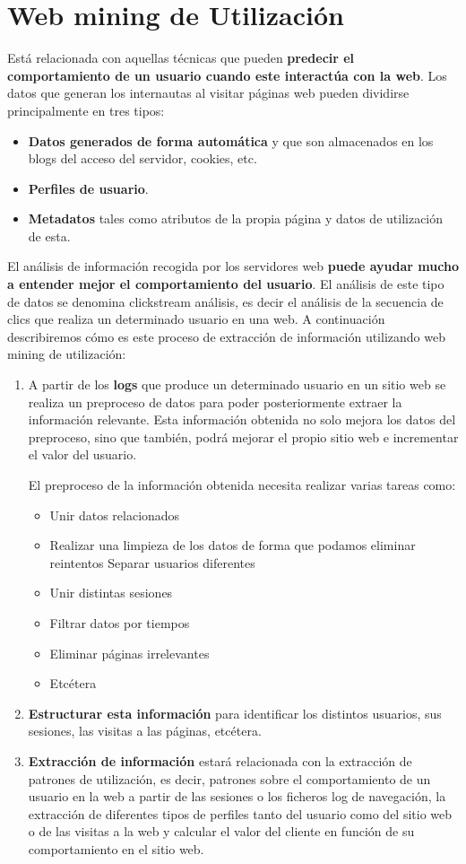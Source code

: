\documentclass[12pt, twoside, openright]{report} %
\begin{document}
\section{Web mining de Utilización}
Está relacionada con aquellas técnicas que pueden \textbf{predecir el comportamiento de un usuario cuando este interactúa con la web}. Los datos que generan los internautas al visitar páginas web pueden dividirse principalmente en tres tipos:
\begin{itemize}
	\item \textbf{Datos generados de forma automática} y que son almacenados en los blogs del acceso del servidor, cookies, etc.
	\item \textbf{Perfiles de usuario}.
	\item \textbf{Metadatos} tales como atributos de la propia página y datos de utilización de esta.
\end{itemize}
El análisis de información recogida por los servidores web \textbf{puede ayudar mucho a entender mejor el comportamiento del usuario}. El análisis de este tipo de datos se denomina clickstream análisis, es decir el análisis de la secuencia de clics que realiza un determinado usuario en una web. A continuación describiremos cómo es este proceso de extracción de información utilizando web mining de utilización:
\begin{enumerate}
	\item A partir de los \textbf{logs} que produce un determinado usuario en un sitio web se realiza un preproceso de datos para poder posteriormente extraer la información relevante. Esta información obtenida no solo mejora los datos del preproceso, sino que también, podrá mejorar el propio sitio web e incrementar el valor del usuario.
	
	El preproceso de la información obtenida necesita realizar varias tareas como:
	\begin{itemize}
		\item Unir datos relacionados
		\item Realizar una limpieza de los datos de forma que podamos eliminar reintentos Separar usuarios diferentes
		\item Unir distintas sesiones
		\item Filtrar datos por tiempos
		\item Eliminar páginas irrelevantes
		\item Etcétera
	\end{itemize}
	\item \textbf{Estructurar esta información} para identificar los distintos usuarios, sus sesiones, las visitas a las páginas, etcétera.
	\item \textbf{Extracción de información} estará relacionada con la extracción de patrones de utilización, es decir, patrones sobre el comportamiento de un usuario en la web a partir de las sesiones o los ficheros log de navegación, la extracción de diferentes tipos de perfiles tanto del usuario como del sitio web o de las visitas a la web y calcular el valor del cliente en función de su comportamiento en el sitio web.
\end{enumerate}
\end{document}
